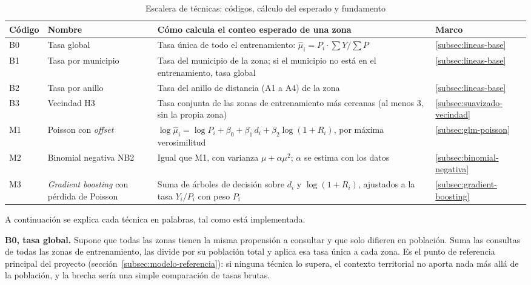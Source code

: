 \begin{table}[H]
  \centering
  \caption{Escalera de técnicas: códigos, cálculo del esperado y fundamento}
  \label{tab:escalera-tecnicas}
  \interlineadoSimple
  \small
  \begin{tabularx}{\textwidth}{@{}L{0.07\textwidth}L{0.20\textwidth}YL{0.11\textwidth}@{}}
    \toprule
    \textbf{Código} & \textbf{Nombre} & \textbf{Cómo calcula el conteo esperado de una zona} & \textbf{Marco} \\
    \midrule
    B0 & Tasa global & Tasa única de todo el entrenamiento: $\hat{\mu}_i = P_i \cdot \sum Y / \sum P$ & \ref{subsec:lineas-base} \\
    B1 & Tasa por municipio & Tasa del municipio de la zona; si el municipio no está en el entrenamiento, tasa global & \ref{subsec:lineas-base} \\
    B2 & Tasa por anillo & Tasa del anillo de distancia (A1 a A4) de la zona & \ref{subsec:lineas-base} \\
    B3 & Vecindad H3 & Tasa conjunta de las zonas de entrenamiento más cercanas (al menos 3, sin la propia zona) & \ref{subsec:suavizado-vecindad} \\
    M1 & Poisson con \emph{offset} & $\log \hat{\mu}_i = \log P_i + \beta_0 + \beta_1\,d_i + \beta_2 \log(1 + R_i)$, por máxima verosimilitud & \ref{subsec:glm-poisson} \\
    M2 & Binomial negativa NB2 & Igual que M1, con varianza $\mu + \alpha\mu^2$; $\alpha$ se estima con los datos & \ref{subsec:binomial-negativa} \\
    M3 & \emph{Gradient boosting} con pérdida de Poisson & Suma de árboles de decisión sobre $d_i$ y $\log(1+R_i)$, ajustados a la tasa $Y_i/P_i$ con peso $P_i$ & \ref{subsec:gradient-boosting} \\
    \bottomrule
  \end{tabularx}
\end{table}

A continuación se explica cada técnica en palabras, tal como está implementada.

\textbf{B0, tasa global.} Supone que todas las zonas tienen la misma propensión a
consultar y que solo difieren en población. Suma las consultas de todas las zonas de
entrenamiento, las divide por su población total y aplica esa tasa única a cada zona. Es
el punto de referencia principal del proyecto (sección~\ref{subsec:modelo-referencia}): si
ninguna técnica lo supera, el contexto territorial no aporta nada más allá de la
población, y la brecha sería una simple comparación de tasas brutas.

